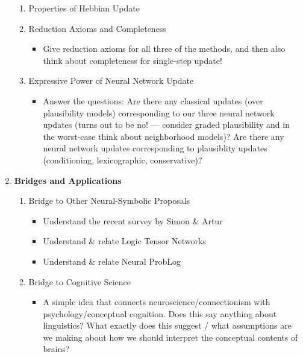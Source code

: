 \documentclass[letterpaper]{article}
\begin{document}
\begin{enumerate}
\begin{enumerate}
        \item Properties of Hebbian Update

        \item Reduction Axioms and Completeness
        \begin{itemize}
            \item Give reduction axioms for all three of the methods, and then also think about completeness for single-step update!
        \end{itemize}
        
        \item Expressive Power of Neural Network Update
        \begin{itemize}
            \item Answer the questions: Are there any classical updates (over plausibility models) corresponding to our three neural network updates (turns out to be no! --- consider graded plausibility and in the worst-case think about neighborhood models)?  Are there any neural network updates corresponding to plausiblity updates (conditioning, lexicographic, conservative)?
        \end{itemize}
    \end{enumerate}

    \item \textbf{Bridges and Applications}
    \begin{enumerate}
        \item Bridge to Other Neural-Symbolic Proposals
        \begin{itemize}
            \item Understand the recent survey by Simon \& Artur
            \item Understand \& relate Logic Tensor Networks
            \item Understand \& relate Neural ProbLog
        \end{itemize}
        
        
        \item Bridge to Cognitive Science
        \begin{itemize}
            \item A simple idea that connects neuroscience/connectionism with psychology/conceptual cognition.  Does this say anything about linguistics?  What exactly does this suggest / what assumptions are we making about how we should interpret the conceptual contents of brains?
        \end{itemize}
        

\end{enumerate}
\end{enumerate}
\end{document}
